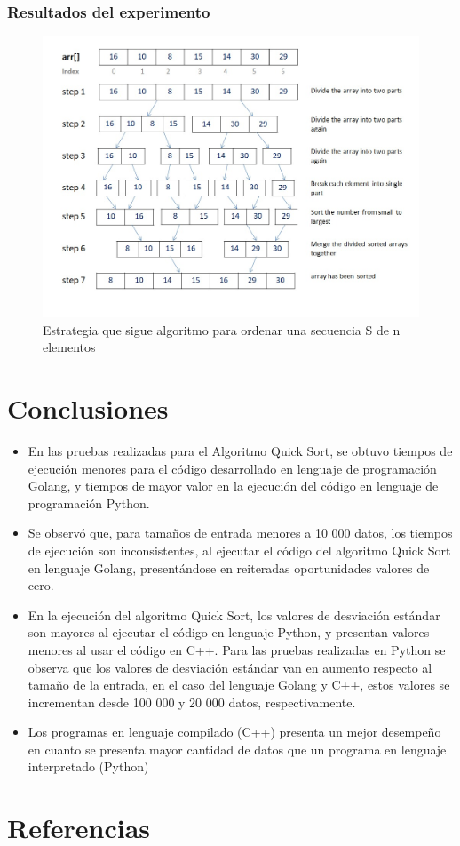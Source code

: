 \documentclass{article}
\begin{document}
         \subsubsection{Resultados del experimento}
         
            \begin{figure}[h!]
                \centering
                \includegraphics[width=12cm]{img/mergesort.png}
                \caption{Estrategia que sigue algoritmo para ordenar una secuencia S de n elementos}
                \label{fig:mergesort}
            \end {figure}

 
    
 
 
    \section{Conclusiones}
        \begin{itemize}
                 \item  En las pruebas realizadas para el Algoritmo Quick Sort, se obtuvo tiempos de ejecución menores para el código desarrollado en lenguaje de programación Golang, y tiempos de mayor valor en la ejecución del código en lenguaje de programación Python.
                 \item	Se observó que, para tamaños de entrada menores a 10 000 datos, los tiempos de ejecución son inconsistentes, al ejecutar el código del algoritmo Quick Sort en lenguaje Golang, presentándose en reiteradas oportunidades valores de cero.
                 \item	En la ejecución del algoritmo Quick Sort, los valores de desviación estándar son mayores al ejecutar el código en lenguaje Python, y presentan valores menores al usar el código en C++. Para las pruebas realizadas en Python se observa que los valores de desviación estándar van en aumento respecto al tamaño de la entrada, en el caso del lenguaje Golang y C++, estos valores se incrementan desde 100 000 y 20 000 datos, respectivamente.
                 \item  Los programas en lenguaje compilado (C++) presenta un mejor desempeño en cuanto se presenta mayor cantidad de datos que un programa en lenguaje interpretado (Python)
        \end{itemize}

    \section{Referencias}
\end{document}
